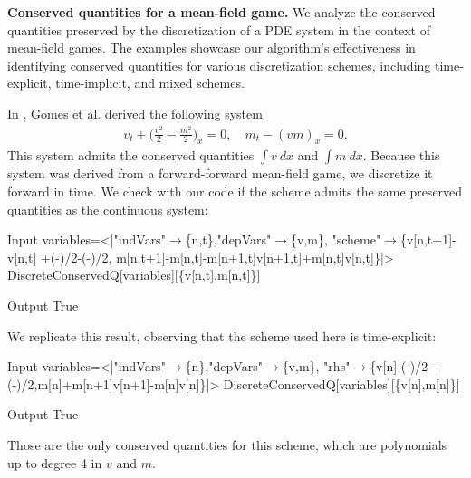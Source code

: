\documentclass[runningheads]{llncs}
\newcommand{\1}{\chi}
\begin{document}
{\bf Conserved quantities for a mean-field game.}
We analyze the conserved quantities preserved by the discretization of a PDE system in the context of mean-field games.
The examples showcase our algorithm's effectiveness in identifying conserved quantities for various discretization schemes, including time-explicit, time-implicit, and mixed schemes.
\begin{example}
	In \cite{gomes18}, Gomes et al. derived the following system
	\begin{gather*}
		v_t+\Big(\frac{v^2}{2}-\frac{m^2}{2}\Big)_x=0,\quad
		m_t-(vm)_x=0.
	\end{gather*}
	This system admits the conserved quantities \(\int v\ dx\) and \(\int m\ dx\).
	Because this system was derived from a forward-forward mean-field game, we discretize it forward in time. We check with our code if the scheme admits the same preserved quantities as the continuous system:
	
	\begin{small}
		\begin{mmaCell}[moredefined={variables, DiscreteConservedQ}]{Input}
  variables=<|"indVars"\(\pmb{\to}\)\{n,t\},"depVars"\(\pmb{\to}\)\{v,m\},
  "scheme"\(\pmb{\to}\)\{v[n,t+1]-v[n,t]
  +(-)/2-(-)/2,
  m[n,t+1]-m[n,t]-m[n+1,t]v[n+1,t]+m[n,t]v[n,t]\}|>
  DiscreteConservedQ[variables][\{v[n,t],m[n,t]\}]
  
\end{mmaCell}
		\begin{mmaCell}{Output}
  True
\end{mmaCell}
	\end{small}
We replicate this result, observing that the scheme used here is time-explicit:
	
	\begin{small}
		\begin{mmaCell}[moredefined={variables, DiscreteConservedQ}]{Input}
  variables=<|"indVars"\(\pmb{\to}\)\{n\},"depVars"\(\pmb{\to}\)\{v,m\},
  "rhs"\(\pmb{\to}\)\{v[n]-(-)/2
  +(-)/2,m[n]+m[n+1]v[n+1]-m[n]v[n]\}|>
  DiscreteConservedQ[variables][\{v[n],m[n]\}]
  
\end{mmaCell}
		\begin{mmaCell}{Output}
  True
\end{mmaCell}
	\end{small}
	Those are the only conserved quantities for this scheme, which are polynomials up to degree 4 in \(v\) and \(m\).
	

\end{example}
\end{document}

